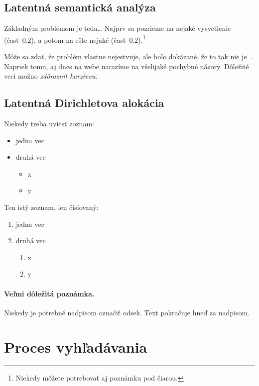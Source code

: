 \documentclass[10pt,twoside,slovak,a4paper]{article}
\begin{document}
\subsection{Latentná semantická analýza} \label{ina}

Základným problémom je teda\ldots{} Najprv sa pozrieme na nejaké vysvetlenie (časť~\ref{ina:nejake}), a potom na ešte nejaké (časť~\ref{ina:nejake}).\footnote{Niekedy môžete potrebovať aj poznámku pod čiarou.}

Môže sa zdať, že problém vlastne nejestvuje\cite{Coplien:MPD}, ale bolo dokázané, že to tak nie je~\cite{Czarnecki:Staged, Czarnecki:Progress}. Napriek tomu, aj dnes na webe narazíme na všelijaké pochybné názory\cite{PLP-Framework}. Dôležité veci možno \emph{zdôrazniť kurzívou}.


\subsection{Latentná Dirichletova alokácia} \label{ina:nejake}

Niekedy treba uviesť zoznam:

\begin{itemize}
\item jedna vec
\item druhá vec
	\begin{itemize}
	\item x
	\item y
	\end{itemize}
\end{itemize}

Ten istý zoznam, len číslovaný:

\begin{enumerate}
\item jedna vec
\item druhá vec
	\begin{enumerate}
	\item x
	\item y
	\end{enumerate}
\end{enumerate}



\paragraph{Veľmi dôležitá poznámka.}
Niekedy je potrebné nadpisom označiť odsek. Text pokračuje hneď za nadpisom.

\section{Proces vyhľadávania} \label{nejaka}
\end{document}
